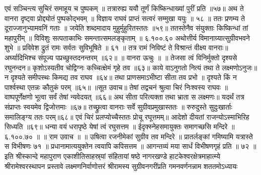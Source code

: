 एवं सञ्चिन्त्य सुचिरं समाहूय च पुष्पकम् ॥
तत्रारुह्य ययौ तूर्णं किष्किन्धाख्यां पुरीं प्रति ॥५७॥
अथ ते वानरा दृष्ट्वा प्रोद्द्योतं पुष्पकोद्भवम् ॥
विज्ञाय राघवं प्राप्तं सत्वरं सम्मुखा ययुः ॥ ५८ ॥
ततः प्रणम्य ते दूराज्जानुभ्यामवनिं गताः ॥
जयेति शब्दमादाय मुहुर्मुहुरितस्ततः ॥५९॥
ततस्तेनैव संयुक्ताः किष्किन्धां तां महापुरीम् ॥
विविशुः सत्पताकाभिः समन्तात्समलङ्कृताम् ॥ ६.१००.६०
अथोत्तीर्य विमानाग्र्यात्सुग्रीवभवने शुभे ॥
प्रविवेश द्रुतं रामः सर्वतः सुविभूषिते ॥ ६१ ॥
तत्र रामं निविष्टं ते विश्रान्तं वीक्ष्य वानराः॥
अर्घ्यादिभिश्च संपूज्य पप्रच्छुस्तदनन्तरम् ॥६२॥
॥ वानरा ऊचुः ॥ ॥
तेजसा त्वं विनिर्मुक्तो दृश्यसे रघुनन्दन॥
कृशोऽस्यतीव चोद्विग्नः कच्चित्क्षेमं गृहे तव ॥६३॥
काये वाऽनुगतो नित्यं तथा ते लक्ष्मणोऽनुजः॥
न दृश्यते समीपस्थः किमद्य तव राघव ॥६४॥
तथा प्राणसमाऽभीष्टा सीता तव प्रभो ॥
दृश्यते किं न पार्श्वस्था एतन्नः कौतुकं परम् ॥६५॥
॥सूत उवाच॥
तेषां तद्वचनं श्रुत्वा चिरं निःश्वस्य राघवः ॥
वाष्पपूर्णेक्षणो भूत्वा सर्वं तेषां न्यवेदयत् ॥६६॥
अथ सीता परित्यक्ता तथा भ्राता स लक्ष्मणः॥
यदर्थं तत्र संप्राप्तः स्वयमेव द्विजोत्तमाः ॥६७॥
तच्छ्रुत्वा वानराः सर्वे सुग्रीवप्रमुखास्ततः ॥
रुरुदुस्ते सुदुःखार्ताः समालिङ्ग्य ततः परम्॥६८॥
एवं चिरं प्रलप्योच्चैस्ततः प्रोचू रघूत्तमम्॥
आदेशो दीयतां राजन्योऽस्माभिरिह सिध्यति ॥६९॥
धन्या वयं धरापृष्ठे येषां त्वं रघुसत्तम ॥
ईदृक्स्नेहसमायुक्तः समागच्छसि मन्दिरे ॥ ६.१००.७० ॥
॥ राम उवाच ॥ ॥
उषित्वा रजनीमेकां सुग्रीव तव मन्दिरे ॥
प्रातर्लङ्कां गमिष्यामि यत्रास्ते स विभीषणः ७१ ॥
प्रधानामात्ययुक्तेन त्वयापि कपिसत्तम ॥
आगन्तव्यं मया सार्धं विभीषणगृहं प्रति ॥ ७२ ॥
इति श्रीस्कान्दे महापुराण एकाशीतिसाहस्र्यां संहितायां षष्ठे नागरखण्डे हाटकेश्वरक्षेत्रमाहात्म्ये श्रीरामेश्वरस्थापन प्रस्तावे लक्ष्मणनिर्वाणोत्तरं श्रीरामस्य सुग्रीवनगरींप्रति गमनवर्णनन्नाम शततमोऽध्यायः

